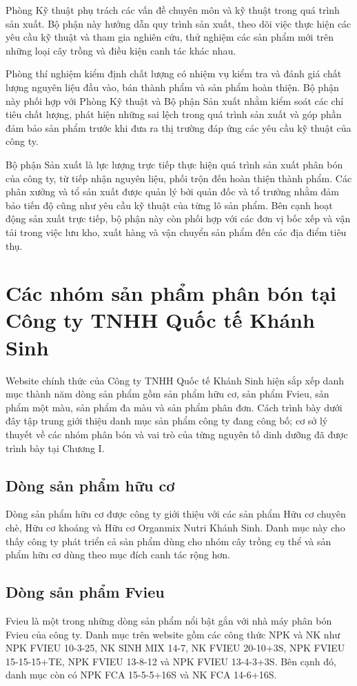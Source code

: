 Phòng Kỹ thuật phụ trách các vấn đề chuyên môn và kỹ thuật trong quá trình sản xuất. 
Bộ phận này hướng dẫn quy trình sản xuất, theo dõi việc thực hiện các yêu cầu kỹ thuật và tham gia nghiên cứu, thử nghiệm các sản phẩm mới trên những loại cây trồng và điều kiện canh tác khác nhau.

Phòng thí nghiệm kiểm định chất lượng có nhiệm vụ kiểm tra và đánh giá chất lượng nguyên liệu đầu vào, bán thành phẩm và sản phẩm hoàn thiện. 
Bộ phận này phối hợp với Phòng Kỹ thuật và Bộ phận Sản xuất nhằm kiểm soát các chỉ tiêu chất lượng, phát hiện những sai lệch trong quá trình sản xuất và góp phần đảm bảo sản phẩm trước khi đưa ra thị trường đáp ứng các yêu cầu kỹ thuật của công ty.

Bộ phận Sản xuất là lực lượng trực tiếp thực hiện quá trình sản xuất phân bón của công ty, từ tiếp nhận nguyên liệu, phối trộn đến hoàn thiện thành phẩm. 
Các phân xưởng và tổ sản xuất được quản lý bởi quản đốc và tổ trưởng nhằm đảm bảo tiến độ cũng như yêu cầu kỹ thuật của từng lô sản phẩm.
Bên cạnh hoạt động sản xuất trực tiếp, bộ phận này còn phối hợp với các đơn vị bốc xếp và vận tải trong việc lưu kho, xuất hàng và vận chuyển sản phẩm đến các địa điểm tiêu thụ. 

\section{Các nhóm sản phẩm phân bón tại Công ty TNHH Quốc tế Khánh Sinh}
Website chính thức của Công ty TNHH Quốc tế Khánh Sinh hiện sắp xếp danh mục thành năm dòng sản phẩm gồm sản phẩm hữu cơ, sản phẩm Fvieu, sản phẩm một màu, sản phẩm đa màu và sản phẩm phân đơn. Cách trình bày dưới đây tập trung giới thiệu danh mục sản phẩm công ty đang công bố; cơ sở lý thuyết về các nhóm phân bón và vai trò của từng nguyên tố dinh dưỡng đã được trình bày tại Chương I.\cite{company-internal-documents}

\subsection{Dòng sản phẩm hữu cơ}
Dòng sản phẩm hữu cơ được công ty giới thiệu với các sản phẩm Hữu cơ chuyên chè, Hữu cơ khoáng và Hữu cơ Organmix Nutri Khánh Sinh. Danh mục này cho thấy công ty phát triển cả sản phẩm dùng cho nhóm cây trồng cụ thể và sản phẩm hữu cơ dùng theo mục đích canh tác rộng hơn.\cite{company-internal-documents}

\subsection{Dòng sản phẩm Fvieu}
Fvieu là một trong những dòng sản phẩm nổi bật gắn với nhà máy phân bón Fvieu của công ty. Danh mục trên website gồm các công thức NPK và NK như NPK FVIEU 10-3-25, NK SINH MIX 14-7, NK FVIEU 20-10+3S, NPK FVIEU 15-15-15+TE, NPK FVIEU 13-8-12 và NPK FVIEU 13-4-3+3S. Bên cạnh đó, danh mục còn có NPK FCA 15-5-5+16S và NK FCA 14-6+16S.\cite{company-internal-documents}

